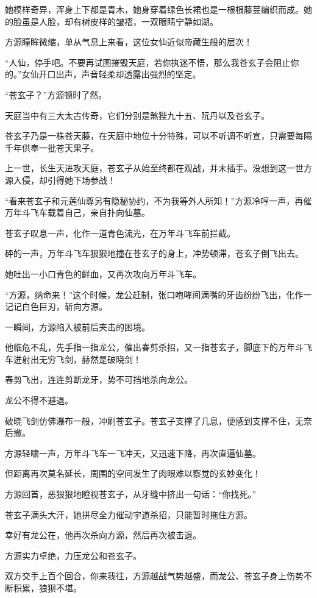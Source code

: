 \begin{this_body}
她模样奇异，浑身上下都是青木，她身穿着绿色长裙也是一根根藤蔓编织而成。她的脸虽是人脸，却有树皮样的皱褶，一双眼睛宁静如湖。

方源瞳眸微缩，单从气息上来看，这位女仙近似帝藏生般的层次！

“人仙，停手吧。不要再试图摧毁天庭，若你执迷不悟，那么我苍玄子会阻止你的。”女仙开口出声，声音轻柔却透露出强烈的坚定。

“苍玄子？”方源顿时了然。

天庭当中有三大太古传奇，它们分别是煞狴九十五、阮丹以及苍玄子。

苍玄子乃是一株苍天藤，在天庭中地位十分特殊，可以不听调不听宣，只需要每隔千年供奉一批苍天果子。

上一世，长生天进攻天庭，苍玄子从始至终都在观战，并未插手。没想到这一世方源入侵，却引得她下场参战！

“看来苍玄子和元莲仙尊另有隐秘协约，不为我等外人所知！”方源冷哼一声，再催万年斗飞车载着自己，亲自扑向仙墓。

苍玄子叹息一声，化作一道青色流光，在万年斗飞车前拦截。

砰的一声，万年斗飞车狠狠地撞在苍玄子的身上，冲势顿滞，苍玄子倒飞出去。

她吐出一小口青色的鲜血，又再次攻向万年斗飞车。

“方源，纳命来！”这个时候，龙公赶制，张口咆哮间满嘴的牙齿纷纷飞出，化作一记记白色巨刃，斩向方源。

一瞬间，方源陷入被前后夹击的困境。

他临危不乱，先手指一指龙公，催出春剪杀招，又一指苍玄子，脚底下的万年斗飞车迸射出无穷飞剑，赫然是破晓剑！

春剪飞出，连连剪断龙牙，势不可挡地杀向龙公。

龙公不得不避退。

破晓飞剑仿佛瀑布一般，冲刷苍玄子。苍玄子支撑了几息，便感到支撑不住，无奈后撤。

方源轻啸一声，万年斗飞车一飞冲天，又迅速下降，再次直逼仙墓。

但距离再次莫名延长，周围的空间发生了肉眼难以察觉的玄妙变化！

方源回首，恶狠狠地瞪视苍玄子，从牙缝中挤出一句话：“你找死。”

苍玄子满头大汗，她拼尽全力催动宇道杀招，只能暂时拖住方源。

幸好有龙公在，他再次杀向方源，然后再次被击退。

方源实力卓绝，力压龙公和苍玄子。

双方交手上百个回合，你来我往，方源越战气势越盛，而龙公、苍玄子身上伤势不断积累，狼狈不堪。


\end{this_body}
